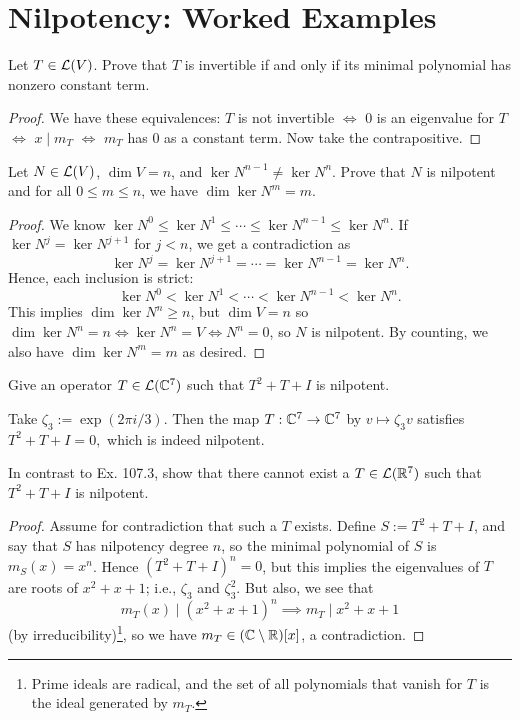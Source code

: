 \documentclass{article}
\begin{document}
\section{Nilpotency: Worked Examples}
\begin{example}
Let $T\in\mathcal L(V)$. Prove that $T$ is invertible if and only if its minimal polynomial has nonzero constant term.
\end{example}
\begin{proof}
We have these equivalences: $T$ is not invertible $\iff$ $0$ is an eigenvalue for $T$ $\iff$ $x\mid m_T$ $\iff$ $m_T$ has $0$ as a constant term. Now take the contrapositive.
\end{proof}
\begin{example}
Let $N\in\mathcal L(V)$, $\dim V = n$, and $\ker N^{n-1} \neq \ker N^n$. Prove that $N$ is nilpotent and for all $0\leq m \leq n$, we have $\dim \ker N^m = m$.
\end{example}
\begin{proof}
We know $\ker N^0 \leq \ker N^1 \leq \cdots \leq \ker N^{n-1} \leq \ker N^n$. If $\ker N^j = \ker N^{j+1}$ for $j < n$, we get a contradiction as
$$\ker N^j = \ker N^{j+1} = \cdots = \ker N^{n-1} = \ker N^n.$$
Hence, each inclusion is strict:
$$\ker N^0 < \ker N^1< \cdots < \ker N^{n-1} < \ker N^n.$$
This implies $\dim\ker N^n \geq n$, but $\dim V = n$ so $\dim \ker N^n = n \iff \ker N^n = V \iff N^n = 0$, so $N$ is nilpotent. By counting, we also have $\dim \ker N^m = m$ as desired.
\end{proof}
\begin{example}
Give an operator $T\in\mathcal L(\mathbb C^7)$ such that $T^2 + T + I$ is nilpotent.
\end{example}
\begin{solution}
Take $\zeta_3 := \exp(2\pi i/3)$. Then the map $T: \mathbb C^7 \to \mathbb C^7$ by $v \mapsto \zeta_3v$ satisfies $T^2 + T + I = 0,$ which is indeed nilpotent.
\end{solution}
\begin{example}
In contrast to Ex. 107.3, show that there cannot exist a $T\in\mathcal L(\mathbb R^7)$ such that $T^2+T+I$ is nilpotent.
\end{example}
\begin{proof}
Assume for contradiction that such a $T$ exists. Define $S := T^2+T+I$, and say that $S$ has nilpotency degree $n$, so the minimal polynomial of $S$ is $m_S(x) = x^n$. Hence $(T^2+T+I)^n = 0$, but this implies the eigenvalues of $T$ are roots of $x^2+x+1$; i.e., $\zeta_3$ and $\zeta_3^2$. But also, we see that
$$m_T(x) \mid (x^2+x+1)^n \implies m_T \mid x^2 + x + 1$$
(by irreducibility)\footnote{Prime ideals are radical, and the set of all polynomials that vanish for $T$ is the ideal generated by $m_T$.}, so we have $m_T \in (\mathbb C\setminus \mathbb R)[x]$, a contradiction.
\end{proof}
\end{document}
